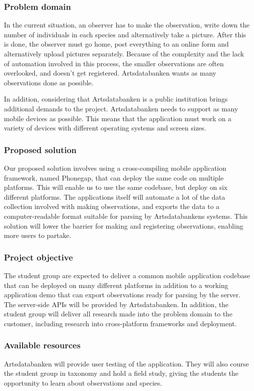 \subsubsection{Problem domain}
In the current situation, an observer has to make the observation, write down
the number of individuals in each species and alternatively take a picture. After this is done,
the observer must go home, post everything to an online form and
alternatively upload pictures separately. Because of the complexity and the
lack of automation involved in this process, the smaller observations are often
overlooked, and doesn't get registered. Artsdatabanken wants as many
observations done as possible.

In addition, considering that Artsdatabanken is a public institution brings
additional demands to the project. Artsdatabanken needs to support as many
mobile devices as possible. This means that the application must work on
a variety of devices with different operating systems and screen sizes.

\subsubsection{Proposed solution}
Our proposed solution involves using a cross-compiling mobile application
framework, named Phonegap, that can deploy the same code on multiple platforms.
This will enable us to use the same codebase, but deploy on six different
platforms. The applications itself will automate a lot of the data collection
involved with making observations, and exports the data to a computer-readable
format suitable for parsing by Artsdatabankens systems. This solution will
lower the barrier for making and registering observations, enabling more users
to partake.

\subsubsection{Project objective}
The student group are expected to deliver a common mobile application codebase
that can be deployed on many different platforms in addition to a working
application demo that can export observations ready for parsing by the server.
The server-side APIs will be provided by Artsdatabanken. In addition, the
student group will deliver all research made into the problem domain to the
customer, including research into cross-platform frameworks and deployment.

\subsubsection{Available resources}
Artsdatabanken will provide user testing of the application. They will also
course the student group in taxonomy and hold a field study, giving the
students the opportunity to learn about observations and species.


